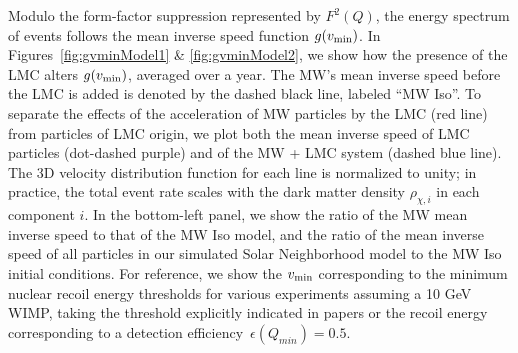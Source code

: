 \documentclass[letterpaper,11pt]{article}
\begin{document}
Modulo the form-factor suppression represented by $F^2(Q)$, the energy spectrum of events follows the mean inverse speed function $g(v_{\rm min})$. In Figures~\ref{fig:gvminModel1} \& \ref{fig:gvminModel2}, we show how the presence of the LMC alters $g(v_{\rm min})$, averaged over a year. The MW's mean inverse speed before the LMC is added is denoted by the dashed black line, labeled ``MW Iso''.  To separate the effects of the acceleration of MW particles by the LMC (red line) from particles of LMC origin, we plot both the mean inverse speed of LMC particles (dot-dashed purple) and of the MW + LMC system (dashed blue line).  The 3D velocity distribution function for each line is normalized to unity; in practice, the total event rate scales with the dark matter density $\rho_{\chi, i}$ in each component $i$. In the bottom-left panel, we show the ratio of the MW mean inverse speed to that of the MW Iso model, and the ratio of the mean inverse speed of all particles in our simulated Solar Neighborhood model to the MW Iso initial conditions.  For reference, we show the $v_{\rm min}$ corresponding to the minimum nuclear recoil energy thresholds for various experiments assuming a 10 GeV WIMP, taking the threshold explicitly indicated in papers or the recoil energy corresponding to a detection efficiency~$\epsilon(Q_{min}) = 0.5$.  

 
\end{document}
